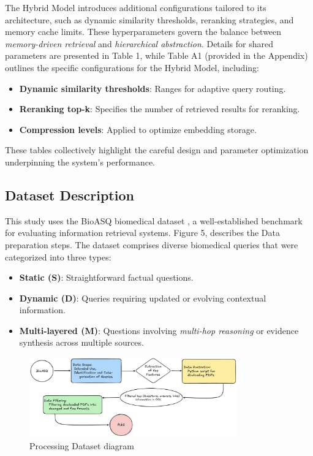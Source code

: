\documentclass[pdflatex,sn-mathphys-num]{sn-jnl}%
\begin{document}
The Hybrid Model introduces additional configurations tailored to its architecture, such as dynamic similarity thresholds, reranking strategies, and memory cache limits. These hyperparameters govern the balance between \emph{memory-driven retrieval} and \emph{hierarchical abstraction}. Details for shared parameters are presented in Table 1, while Table A1 (provided in the Appendix) outlines the specific configurations for the Hybrid Model, including:
\begin{itemize}
    \item \textbf{Dynamic similarity thresholds}: Ranges for adaptive query routing.
    \item \textbf{Reranking top-k}: Specifies the number of retrieved results for reranking.
    \item \textbf{Compression levels}: Applied to optimize embedding storage.
\end{itemize}

These tables collectively highlight the careful design and parameter optimization underpinning the system's performance.


\subsection{Dataset Description}\label{subsec2}
This study uses the BioASQ biomedical dataset \cite{bib23}, a well-established benchmark for evaluating information retrieval systems. Figure 5, describes the Data preparation steps. The dataset comprises diverse biomedical queries that were categorized into three types:
\begin{itemize}
    \item \textbf{Static (S)}: Straightforward factual questions.
    \item \textbf{Dynamic (D)}: Queries requiring updated or evolving contextual information.
    \item \textbf{Multi-layered (M)}: Questions involving \emph{multi-hop reasoning} or evidence synthesis across multiple sources.
\end{itemize}

\begin{figure}[h]
    \centering
    \includegraphics[width=0.8\textwidth]{Dataset_Diagram.eps}
    \caption{Processing Dataset diagram}
    \label{fig:Dataset_Diagram}
\end{figure}
\end{document}
